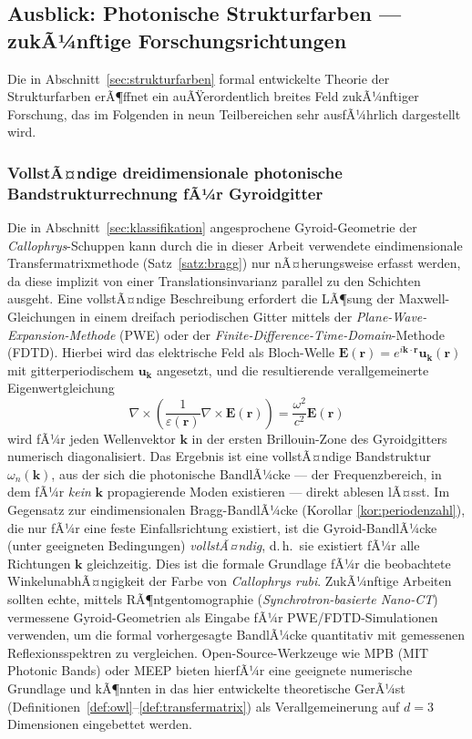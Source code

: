 ﻿\documentclass[a4paper,12pt]{article}
\theoremstyle{definition}
\begin{document}
	\subsection{Ausblick: Photonische Strukturfarben --- zukÃ¼nftige Forschungsrichtungen}
	\label{sec:ausblick_struktur}

	Die in Abschnitt~\ref{sec:strukturfarben} formal entwickelte Theorie der
	Strukturfarben erÃ¶ffnet ein auÃŸerordentlich breites Feld zukÃ¼nftiger
	Forschung, das im Folgenden in neun Teilbereichen sehr ausfÃ¼hrlich
	dargestellt wird.

	\subsubsection{VollstÃ¤ndige dreidimensionale photonische Bandstrukturrechnung fÃ¼r Gyroidgitter}

	Die in Abschnitt~\ref{sec:klassifikation} angesprochene Gyroid-Geometrie
	der \textit{Callophrys}-Schuppen kann durch die in dieser Arbeit
	verwendete eindimensionale Transfermatrixmethode (Satz~\ref{satz:bragg})
	nur nÃ¤herungsweise erfasst werden, da diese implizit von einer
	Translationsinvarianz parallel zu den Schichten ausgeht. Eine
	vollstÃ¤ndige Beschreibung erfordert die LÃ¶sung der
	Maxwell-Gleichungen in einem dreifach periodischen Gitter mittels der
	\emph{Plane-Wave-Expansion-Methode} (PWE) oder der
	\emph{Finite-Difference-Time-Domain}-Methode (FDTD). Hierbei wird das
	elektrische Feld als Bloch-Welle
	$\mathbf{E}(\mathbf{r}) = e^{i\mathbf{k}\cdot\mathbf{r}}
	\mathbf{u}_{\mathbf{k}}(\mathbf{r})$ mit gitterperiodischem
	$\mathbf{u}_{\mathbf{k}}$ angesetzt, und die resultierende
	verallgemeinerte Eigenwertgleichung
	\[
	\nabla\times\left(\frac{1}{\varepsilon(\mathbf{r})}\nabla\times
	\mathbf{E}(\mathbf{r})\right) = \frac{\omega^2}{c^2}\mathbf{E}(\mathbf{r})
	\]
	wird fÃ¼r jeden Wellenvektor $\mathbf{k}$ in der ersten Brillouin-Zone
	des Gyroidgitters numerisch diagonalisiert. Das Ergebnis ist eine
	vollstÃ¤ndige Bandstruktur $\omega_n(\mathbf{k})$, aus der sich die
	photonische BandlÃ¼cke --- der Frequenzbereich, in dem fÃ¼r \emph{kein}
	$\mathbf{k}$ propagierende Moden existieren --- direkt ablesen lÃ¤sst.
	Im Gegensatz zur eindimensionalen Bragg-BandlÃ¼cke (Korollar
	\ref{kor:periodenzahl}), die nur fÃ¼r eine feste Einfallsrichtung
	existiert, ist die Gyroid-BandlÃ¼cke (unter geeigneten Bedingungen)
	\emph{vollstÃ¤ndig}, d.\,h.\ sie existiert fÃ¼r alle Richtungen
	$\mathbf{k}$ gleichzeitig. Dies ist die formale Grundlage fÃ¼r die
	beobachtete WinkelunabhÃ¤ngigkeit der Farbe von \textit{Callophrys
		rubi}. ZukÃ¼nftige Arbeiten sollten echte, mittels
	RÃ¶ntgentomographie (\textit{Synchrotron-basierte Nano-CT}) vermessene
	Gyroid-Geometrien als Eingabe fÃ¼r PWE/FDTD-Simulationen verwenden, um
	die formal vorhergesagte BandlÃ¼cke quantitativ mit gemessenen
	Reflexionsspektren zu vergleichen. Open-Source-Werkzeuge wie MPB (MIT
	Photonic Bands) oder MEEP bieten hierfÃ¼r eine geeignete numerische
	Grundlage und kÃ¶nnten in das hier entwickelte theoretische GerÃ¼st
	(Definitionen~\ref{def:owl}--\ref{def:transfermatrix}) als
	Verallgemeinerung auf $d=3$ Dimensionen eingebettet werden.
\end{document}

